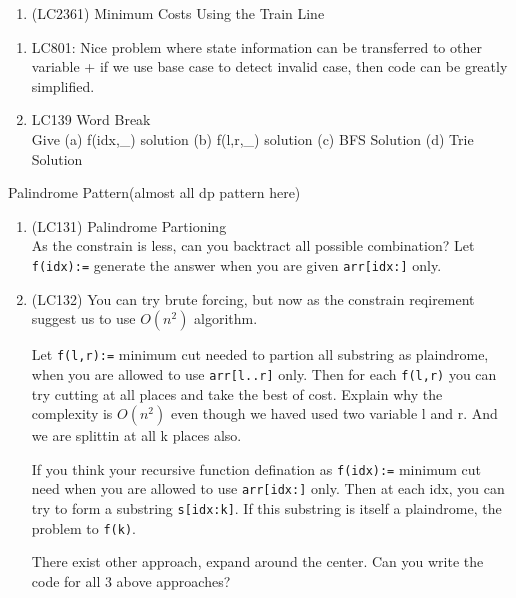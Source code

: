 \begin{exercise}
    \begin{enumerate}
        \item (LC2361) Minimum Costs Using the Train Line
    \end{enumerate}
\end{exercise}

\begin{exerciseHints}[Solutions/Comments:]
    \begin{enumerate}
        \item LC801: Nice problem where state information can be transferred to other variable + if we use base case to detect invalid case, then code can be greatly simplified.
        \item LC139 Word Break \\Give (a) f(idx,\_) solution (b) f(l,r,\_) solution (c) BFS Solution (d) Trie Solution
    \end{enumerate}

    { \Large Palindrome Pattern(almost all dp pattern here) \\}
    \begin{enumerate}
        \item (LC131) Palindrome Partioning \\As the constrain is less, can you backtract all possible combination? Let \verb|f(idx):=| generate the answer when you are given \verb|arr[idx:]| only.
        
        \item (LC132) You can try brute forcing, but now as the constrain reqirement suggest us to use $O(n^2)$ algorithm.
        
        Let \verb|f(l,r):=| minimum cut needed to partion all substring as plaindrome, when you are allowed to use \verb|arr[l..r]| only. Then for each \verb|f(l,r)| you can try cutting at all places and take the best of cost.
        Explain why the complexity is $O(n^2)$ even though we haved used two variable l and r. And we are splittin at all k places also.
        
        If you think your recursive function defination as \verb|f(idx):=| minimum cut need when you are allowed to use \verb|arr[idx:]| only. Then at each idx, you can try to form a substring \verb|s[idx:k]|. If this substring is itself a plaindrome, the problem to \verb|f(k)|.

        There exist other approach, expand around the center. Can you write the code for all 3 above approaches?


\end{enumerate}
\end{exerciseHints}
